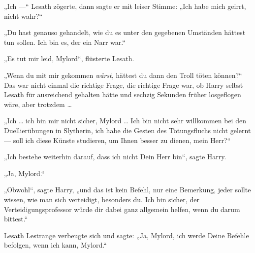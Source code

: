 „Ich —“ Lesath zögerte, dann sagte er mit leiser Stimme:
„Ich habe mich geirrt, nicht wahr?“

„Du hast genauso gehandelt, wie du es unter den gegebenen Umständen hättest tun sollen. Ich bin es, der ein Narr war.“

„Es tut mir leid, Mylord“, flüsterte Lesath.

„Wenn du mit mir gekommen \emph{wärst}, hättest du dann den Troll töten können?“ Das war nicht einmal die richtige Frage, die richtige Frage war, ob Harry selbst Lesath für ausreichend gehalten hätte und sechzig Sekunden früher losgeflogen wäre, aber trotzdem …

„Ich … ich bin mir nicht sicher, Mylord … Ich bin nicht sehr willkommen bei den Duellierübungen in Slytherin, ich habe die Gesten des Tötungsfluchs nicht gelernt — soll ich diese Künste studieren, um Ihnen besser zu dienen, mein Herr?“

„Ich bestehe weiterhin darauf, dass ich nicht Dein Herr bin“, sagte Harry.

„Ja, Mylord.“

„Obwohl“, sagte Harry, „und das ist kein Befehl, nur eine Bemerkung, jeder sollte wissen, wie man sich verteidigt, besonders du. Ich bin sicher, der Verteidigungsprofessor würde dir dabei ganz allgemein helfen, wenn du darum bittest.“

Lesath Lestrange verbeugte sich und sagte:
„Ja, Mylord, ich werde Deine Befehle befolgen, wenn ich kann, Mylord.“

